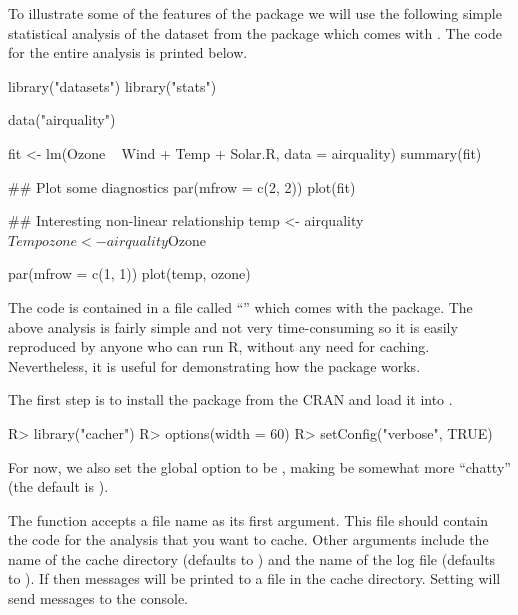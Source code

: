 \documentclass[nojss]{jss}
\begin{document}
To illustrate some of the features of the  package we will
use the following simple statistical analysis of the 
dataset from the  package which comes with .  The code
for the entire analysis is printed below.
\begin{Schunk}
\begin{Soutput}
library("datasets")
library("stats")

data("airquality")

fit <- lm(Ozone ~ Wind + Temp + Solar.R, data = airquality)
summary(fit)

## Plot some diagnostics
par(mfrow = c(2, 2))
plot(fit)

## Interesting non-linear relationship
temp <- airquality$Temp
ozone <- airquality$Ozone

par(mfrow = c(1, 1))
plot(temp, ozone)
\end{Soutput}
\end{Schunk}
The code is contained in a file called ``'' which comes with
the  package.  The above analysis is fairly simple and not
very time-consuming so it is easily reproduced by anyone who can run
R, without any need for caching.  Nevertheless, it is useful for
demonstrating how the  package works.

The first step is to install the  package from the
CRAN and load it into .
\begin{Schunk}
\begin{Sinput}
R> library("cacher")
R> options(width = 60)
R> setConfig("verbose", TRUE)
\end{Sinput}
\end{Schunk}
For now, we also set the global  option to be
, making  be somewhat more ``chatty'' (the
default is ).

The  function accepts a file name as its first argument.
This file should contain the code for the analysis that you want to
cache.  Other arguments include the name of the cache directory
(defaults to ) and the name of the log file (defaults to
).  If  then messages will be printed
to a file in the cache directory.  Setting  will
send messages to the console.
\end{document}
